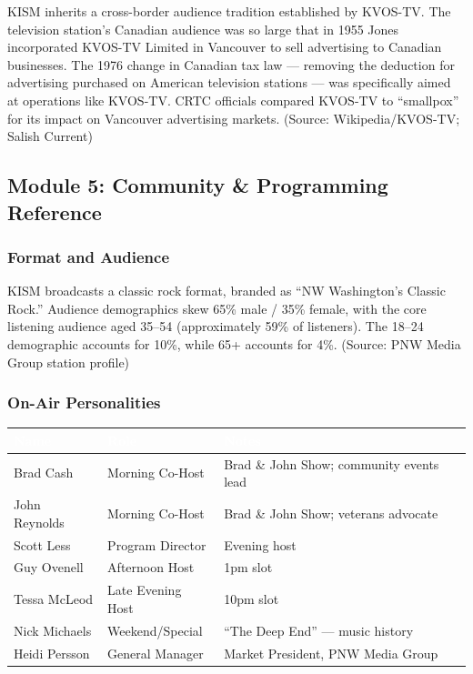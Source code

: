 \documentclass[11pt,letterpaper]{article}
\newcommand{\tableheader}[1]{\textbf{\sffamily\textcolor{white}{#1}}}
\begin{document}
KISM inherits a cross-border audience tradition established by KVOS-TV. The television station's Canadian audience was so large that in 1955 Jones incorporated KVOS-TV Limited in Vancouver to sell advertising to Canadian businesses. The 1976 change in Canadian tax law --- removing the deduction for advertising purchased on American television stations --- was specifically aimed at operations like KVOS-TV. CRTC officials compared KVOS-TV to ``smallpox'' for its impact on Vancouver advertising markets. (Source: Wikipedia/KVOS-TV; Salish Current)

\subsection{Module 5: Community \& Programming Reference}

\subsubsection{Format and Audience}

KISM broadcasts a classic rock format, branded as ``NW Washington's Classic Rock.'' Audience demographics skew 65\% male / 35\% female, with the core listening audience aged 35--54 (approximately 59\% of listeners). The 18--24 demographic accounts for 10\%, while 65+ accounts for 4\%. (Source: PNW Media Group station profile)

\subsubsection{On-Air Personalities}

\begin{center}
\begin{tabularx}{\textwidth}{L{3cm}L{3cm}X}
\toprule
{}
\tableheader{Name} & \tableheader{Role} & \tableheader{Notes} \\
\midrule
Brad Cash & Morning Co-Host & Brad \& John Show; community events lead \\
John Reynolds & Morning Co-Host & Brad \& John Show; veterans advocate \\
Scott Less & Program Director & Evening host \\
Guy Ovenell & Afternoon Host & 1pm slot \\
Tessa McLeod & Late Evening Host & 10pm slot \\
Nick Michaels & Weekend/Special & ``The Deep End'' --- music history \\
Heidi Persson & General Manager & Market President, PNW Media Group \\
\bottomrule
\end{tabularx}
\end{center}
\end{document}
